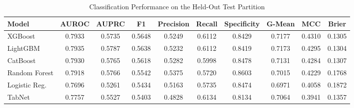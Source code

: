 \begin{table}
\centering
\caption{Classification Performance on the Held-Out Test Partition}
\label{tab:results}
\begin{tabular}{lccccccccc}
\toprule
Model & AUROC & AUPRC & F1 & Precision & Recall & Specificity & G-Mean & MCC & Brier \\
\midrule
XGBoost & 0.7933 & 0.5735 & 0.5648 & 0.5249 & 0.6112 & 0.8429 & 0.7177 & 0.4310 & 0.1305 \\
LightGBM & 0.7935 & 0.5787 & 0.5638 & 0.5232 & 0.6112 & 0.8419 & 0.7173 & 0.4295 & 0.1304 \\
CatBoost & 0.7930 & 0.5765 & 0.5618 & 0.5282 & 0.5998 & 0.8478 & 0.7131 & 0.4284 & 0.1307 \\
Random Forest & 0.7918 & 0.5766 & 0.5542 & 0.5375 & 0.5720 & 0.8603 & 0.7015 & 0.4229 & 0.1768 \\
Logistic Reg. & 0.7696 & 0.5261 & 0.5434 & 0.5163 & 0.5735 & 0.8474 & 0.6971 & 0.4058 & 0.1872 \\
TabNet & 0.7757 & 0.5527 & 0.5403 & 0.4828 & 0.6134 & 0.8134 & 0.7064 & 0.3941 & 0.1357 \\
\bottomrule
\end{tabular}
\end{table}
